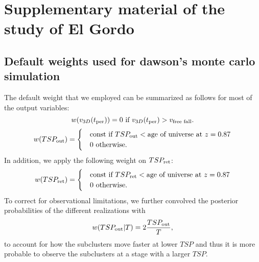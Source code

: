 \documentclass[ucdthesis.tex]{subfiles}
\begin{document}
    
    \pagestyle{plain}
    \doublespacing
		\chapter{Supplementary material of the study of El Gordo}{}{}
		\label{appendix1}

						 
		\cfoot{\thepage}

    \section{Default weights used for dawson's monte carlo simulation}
    \label{app:priors}
    The default weight that we employed can be summarized as
    follows for most of the output variables: 
    \begin{equation}
    	w(v_{3D}(t_{\rm per})) = 0\text{ if }v_{3D}(t_{\rm per}) >
    	v_{\text{free fall}}. 
    \end{equation}
    \begin{equation}
    	w(TSP_{\rm out}) = 
    	\begin{cases}
    		& \text{const}~\text{if }TSP_{\rm out} < \text{age of universe at } z=0.87	\\
    		& 0~\text{otherwise}.
    	\end{cases}
    \end{equation}
    In addition, we apply the following weight on $TSP_{\rm ret}$:
    \begin{equation}
    	w(TSP_{\rm ret}) = 
    	\begin{cases}
    		& \text{const}~\text{if }TSP_{\rm ret} < \text{age of universe at } z=0.87	\\
    		& 0~\text{otherwise} \label{eqn:TSM_1}.
    	\end{cases}
    \end{equation}
    To correct for observational limitations, we further convolved the
    posterior probabilities of the different realizations with 
    \begin{equation}
    	w(TSP_{\rm out} | T) = 2 \frac{TSP_{\rm out}}{T},
    \end{equation}
    to account for how the subclusters move faster at lower $TSP$ and thus it
    is more probable to observe the subclusters at a stage with a larger $TSP$.
    \par 
\end{document}

